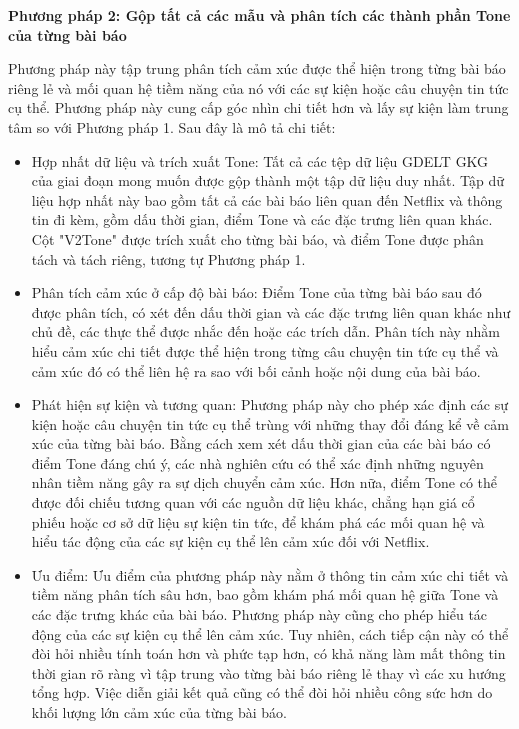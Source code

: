 \textbf{Phương pháp 2: Gộp tất cả các mẫu và phân tích các thành phần Tone của từng bài báo}

Phương pháp này tập trung phân tích cảm xúc được thể hiện trong từng bài báo riêng lẻ và mối quan hệ tiềm năng của nó với các sự kiện hoặc câu chuyện tin tức cụ thể. Phương pháp này cung cấp góc nhìn chi tiết hơn và lấy sự kiện làm trung tâm so với Phương pháp 1. Sau đây là mô tả chi tiết:

\begin{itemize}
\item
  Hợp nhất dữ liệu và trích xuất Tone: Tất cả các tệp dữ liệu GDELT GKG của giai đoạn mong muốn được gộp thành một tập dữ liệu duy nhất. Tập dữ liệu hợp nhất này bao gồm tất cả các bài báo liên quan đến Netflix và thông tin đi kèm, gồm dấu thời gian, điểm Tone và các đặc trưng liên quan khác. Cột "V2Tone" được trích xuất cho từng bài báo, và điểm Tone được phân tách và tách riêng, tương tự Phương pháp 1.
\item
  Phân tích cảm xúc ở cấp độ bài báo: Điểm Tone của từng bài báo sau đó được phân tích, có xét đến dấu thời gian và các đặc trưng liên quan khác như chủ đề, các thực thể được nhắc đến hoặc các trích dẫn. Phân tích này nhằm hiểu cảm xúc chi tiết được thể hiện trong từng câu chuyện tin tức cụ thể và cảm xúc đó có thể liên hệ ra sao với bối cảnh hoặc nội dung của bài báo.
\item
  Phát hiện sự kiện và tương quan: Phương pháp này cho phép xác định các sự kiện hoặc câu chuyện tin tức cụ thể trùng với những thay đổi đáng kể về cảm xúc của từng bài báo. Bằng cách xem xét dấu thời gian của các bài báo có điểm Tone đáng chú ý, các nhà nghiên cứu có thể xác định những nguyên nhân tiềm năng gây ra sự dịch chuyển cảm xúc. Hơn nữa, điểm Tone có thể được đối chiếu tương quan với các nguồn dữ liệu khác, chẳng hạn giá cổ phiếu hoặc cơ sở dữ liệu sự kiện tin tức, để khám phá các mối quan hệ và hiểu tác động của các sự kiện cụ thể lên cảm xúc đối với Netflix.
\item
  Ưu điểm: Ưu điểm của phương pháp này nằm ở thông tin cảm xúc chi tiết và tiềm năng phân tích sâu hơn, bao gồm khám phá mối quan hệ giữa Tone và các đặc trưng khác của bài báo. Phương pháp này cũng cho phép hiểu tác động của các sự kiện cụ thể lên cảm xúc. Tuy nhiên, cách tiếp cận này có thể đòi hỏi nhiều tính toán hơn và phức tạp hơn, có khả năng làm mất thông tin thời gian rõ ràng vì tập trung vào từng bài báo riêng lẻ thay vì các xu hướng tổng hợp. Việc diễn giải kết quả cũng có thể đòi hỏi nhiều công sức hơn do khối lượng lớn cảm xúc của từng bài báo.
\end{itemize}

